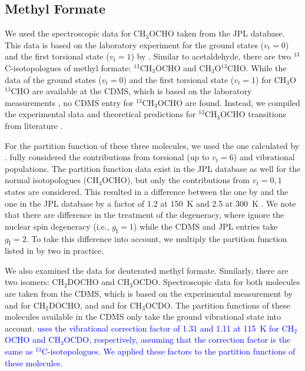 \documentclass[twocolumn, twocolappendix, astrosymb, times]{aastex631}
\newcommand{\methylformate}{CH$_3$OCHO\xspace}
\begin{document}
\subsection{Methyl Formate}
We used the spectroscopic data for \methylformate taken from the JPL database. This data is based on the laboratory experiment for the ground states ($v_t = 0$) and the first torsional state ($v_t = 1$) by \citet{Ilyushin2009}. Similar to acetaldehyde, there are two $^{13}$C-isotopologues of methyl formate: $^{13}$CH$_3$OCHO and CH$_3$O$^{13}$CHO. While the data of the ground states ($v_t = 0$) and the first torsional state ($v_t = 1$) for CH$_3$O$^{13}$CHO are available at the CDMS, which is based on the laboratory measurements \citep[][and references therein]{Carvajal2010}, no CDMS entry for $^{13}$CH$_3$OCHO are found. Instead, we compiled the experimental data and theoretical predictions for $^{13}$CH$_3$OCHO transitions from literature \citep{Carvajal2009, Haykal2014, Favre2014}. 

For the partition function of these three molecules, we used the one calculated by \citet{Favre2014}. \citet{Favre2014} fully considered the contributions from torsional (up to $v_t=6$) and vibrational populations. The partition function data exist in the JPL database as well for the normal isotopologues (\methylformate), but only the contributions from $v_t = 0, 1$ states are considered. This resulted in a difference between the one by \citet{Favre2014} and the one in the JPL database by a factor of 1.2 at 150~K and 2.5 at 300~K \citep{Favre2014}. We note that there are difference in the treatment of the degeneracy, where \citet{Favre2014} ignore the nuclear spin degeneracy (i.e., $g_\mathrm{I} = 1$) while the CDMS and JPL entries take $g_\mathrm{I} = 2$. To take this difference into account, we multiply the partition function listed in \citet{Favre2014} by two in practice.

We also examined the data for deuterated methyl formate. Similarly, there are two isomers: CH$_2$DOCHO and CH$_3$OCDO. Spectroscopic data for both molecules are taken from the CDMS, which is based on the experimental measurement by \citet{Coudert2013} and \citet{Margules2009} for CH$_2$DOCHO, and \citet{Margules2010} and \citet{Duan2015} for CH$_3$OCDO. The partition functions of these molecules available in the CDMS only take the ground vibrational state into account. 
\textcolor{blue}{\citet{Manigand2019} uses the vibrational correction factor of 1.31 and 1.11 at 115~K for CH$_2$OCHO and CH$_3$OCDO, respectively, assuming that the correction factor is the same as $^{13}$C-isotopologues. We applied these factors to the partition functions of these molecules.}
\end{document}
